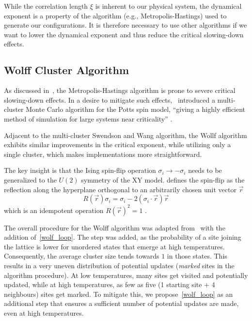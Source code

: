 		While the correlation length $\xi$ is inherent to our physical system, the dynamical exponent is a property of the algorithm (e.g., Metropolis-Hastings) used to generate our configurations. It is therefore necessary to use other algorithms if we want to lower the dynamical exponent and thus reduce the critical slowing-down effects.
		
	\subsection{Wolff Cluster Algorithm}\label{sec:theo:wolff_cluster}
		As discussed in~, the Metropolis-Hastings algorithm is prone to severe critical slowing-down effects. In a desire to mitigate such effects,~\cite{sw} introduced a multi-cluster Monte Carlo algorithm for the Potts spin model, \enquote{giving a highly efficient method of simulation for large systems near criticality} \cite[p. 86]{sw}.
		
		Adjacent to the multi-cluster Swendson and Wang algorithm, the Wollf algorithm exhibits similar improvements in the critical exponent, while utilizing only a single cluster, which makes implementations more straightforward.
		
		The key insight is that the Ising spin-flip operation $\sigma_i \rightarrow -\sigma_i$ needs to be generalized to the $U(2)$ symmetry of the XY model. \cite{wolff} defines the spin-flip as the reflection along the hyperplane orthogonal to an arbitrarily chosen unit vector $\vec{r}$
		\begin{equation}
			R(\vec{r}) \sigma_i = \sigma_i - 2 (\sigma_i \cdot \vec{r}) \vec{r} 
		\end{equation}
		which is an idempotent operation $R(\vec{r})^2=1$ \cite[eq. 3]{wolff}.
	
		The overall procedure for the Wolff algorithm was adapted from~\citet[p. 361]{wolff} with the addition of~\cref{wolf_loop}. The step was added, as the probability of a site joining the lattice is lower for unordered states that emerge at high temperatures. Consequently, the average cluster size tends towards $1$ in those states. This results in a very uneven distribution of potential updates (\emph{marked} sites in the algorithm procedure). At low temperatures, many sites get visited and potentially updated, while at high temperatures, as few as five (1 starting site + 4 neighbours) sites get marked. To mitigate this, we propose~\cref{wolf_loop} as an additional step that ensures a sufficient number of potential updates are made, even at high temperatures.
		
